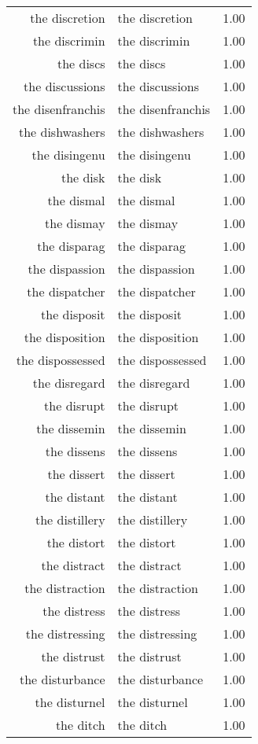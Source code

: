 \begin{table}[ht]
\begin{tabular}{rlr}
  the discretion & the discretion & 1.00 \\ 
  the discrimin & the discrimin & 1.00 \\ 
  the discs & the discs & 1.00 \\ 
  the discussions & the discussions & 1.00 \\ 
  the disenfranchis & the disenfranchis & 1.00 \\ 
  the dishwashers & the dishwashers & 1.00 \\ 
  the disingenu & the disingenu & 1.00 \\ 
  the disk & the disk & 1.00 \\ 
  the dismal & the dismal & 1.00 \\ 
  the dismay & the dismay & 1.00 \\ 
  the disparag & the disparag & 1.00 \\ 
  the dispassion & the dispassion & 1.00 \\ 
  the dispatcher & the dispatcher & 1.00 \\ 
  the disposit & the disposit & 1.00 \\ 
  the disposition & the disposition & 1.00 \\ 
  the dispossessed & the dispossessed & 1.00 \\ 
  the disregard & the disregard & 1.00 \\ 
  the disrupt & the disrupt & 1.00 \\ 
  the dissemin & the dissemin & 1.00 \\ 
  the dissens & the dissens & 1.00 \\ 
  the dissert & the dissert & 1.00 \\ 
  the distant & the distant & 1.00 \\ 
  the distillery & the distillery & 1.00 \\ 
  the distort & the distort & 1.00 \\ 
  the distract & the distract & 1.00 \\ 
  the distraction & the distraction & 1.00 \\ 
  the distress & the distress & 1.00 \\ 
  the distressing & the distressing & 1.00 \\ 
  the distrust & the distrust & 1.00 \\ 
  the disturbance & the disturbance & 1.00 \\ 
  the disturnel & the disturnel & 1.00 \\ 
  the ditch & the ditch & 1.00 \\ 

\end{tabular}
\end{table}
